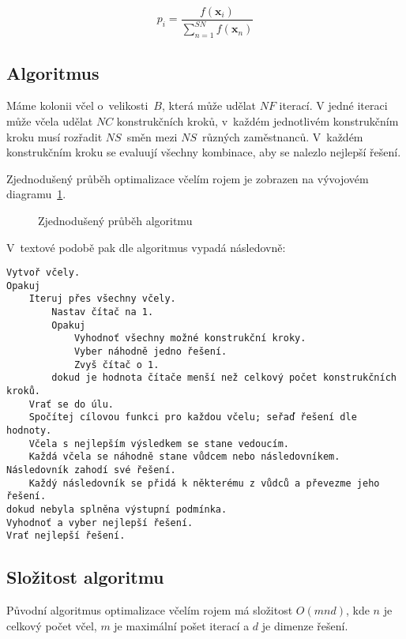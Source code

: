 \documentclass[twoside]{ctuthesis}
\begin{document}
\begin{equation}
	\label{eq:beeprobability}
	p_i = \frac{f(\boldsymbol{x}_i)}{\sum_{n = 1}^{SN} f(\boldsymbol{x}_n)}
\end{equation}

\newpage
\subsection{Algoritmus}
Máme kolonii včel o~velikosti~$B$, která může udělat $NF$ iterací. V jedné iteraci může včela udělat $NC$ konstrukčních kroků, v~každém jednotlivém konstrukčním kroku musí rozřadit $NS$~směn mezi $NS$~různých zaměstnanců. V~každém konstrukčním kroku se evaluují všechny kombinace, aby se nalezlo nejlepší řešení. \cite{khader2013artificial}

Zjednodušený průběh optimalizace včelím rojem je zobrazen na vývojovém diagramu~\ref{fig:beeflow}.
\begin{figure}[h]
	
	\caption{Zjednodušený průběh algoritmu}
	\label{fig:beeflow}
\end{figure}

V~textové podobě pak dle \cite{rajeswari2017directed} algoritmus vypadá následovně:
\begin{lstlisting}
Vytvoř včely.
Opakuj
	Iteruj přes všechny včely.
		Nastav čítač na 1.
		Opakuj
			Vyhodnoť všechny možné konstrukční kroky.
			Vyber náhodně jedno řešení.
			Zvyš čítač o 1.
		dokud je hodnota čítače menší než celkový počet konstrukčních kroků.
	Vrať se do úlu.
	Spočítej cílovou funkci pro každou včelu; seřaď řešení dle hodnoty.
	Včela s nejlepším výsledkem se stane vedoucím.
	Každá včela se náhodně stane vůdcem nebo následovníkem. Následovník zahodí své řešení.
	Každý následovník se přidá k některému z vůdců a převezme jeho řešení.
dokud nebyla splněna výstupní podmínka.
Vyhodnoť a vyber nejlepší řešení.
Vrať nejlepší řešení.
\end{lstlisting}

\subsection{Složitost algoritmu}

Původní algoritmus optimalizace včelím rojem má složitost $O(mnd)$, kde $n$ je celkový počet včel, $m$ je maximální pošet iterací a $d$ je dimenze řešení. \cite{banharnsakun2011best}


\end{document}
